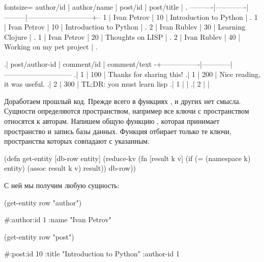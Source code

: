 \else

\begin{english}
  \begin{text*}{fontsize=\small}
author/id | author/name | post/id |         post/title        | .
----------|-------------|---------|---------------------------+--
        1 | Ivan Petrov |      10 | Introduction to Python    | .
        1 | Ivan Petrov |      10 | Introduction to Python    | .
        2 | Ivan Rublev |      30 | Learning Clojure          | .
        1 | Ivan Petrov |      20 | Thoughts on LISP          | .
        2 | Ivan Rublev |      40 | Working on my pet project | .

.| post/author-id | comment/id |         comment/text
-+----------------|------------|-----------------------------
.|              1 |        100 | Thanks for sharing this!
.|              1 |        200 | Nice reading, it was useful.
.|              2 |        300 | TL;DR: you must learn lisp
.|              1 |            |
.|              2 |            |
  \end{text*}
\end{english}

\fi

Доработаем прошлый код. Прежде всего в функциях ,  и других нет смысла. Сущности определяются пространством, например все ключи с пространством  относятся к авторам. Напишем общую функцию , которая принимает пространство и запись базы данных. Функция отбирает только те ключи, пространства которых совпадают с указанным.

\begin{english}
  \begin{clojure}
(defn get-entity
  [db-row entity]
  (reduce-kv
   (fn [result k v]
     (if (= (namespace k) entity)
       (assoc result k v)
       result))
   {}
   db-row))
  \end{clojure}
\end{english}

С ней мы получим любую сущность:

\begin{english}
  \begin{clojure}
(get-entity row "author")

#:author{:id 1 :name "Ivan Petrov"}

(get-entity row "post")

#:post{:id 10
       :title "Introduction to Python"
       :author-id 1}
  \end{clojure}
\end{english}

